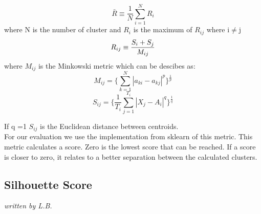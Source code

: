 \begin{equation}
	\bar{R} \equiv \frac{1}{N} \sum_{i=1}^{N} R_i  
\end{equation}
where N is the number of cluster and $R_i$ is the maximum of $R_{ij}$ where i$\neq$j 
\begin{equation}
	R_{ij} \equiv \frac{S_i+ S_j}{M_{ij}} \\
\end{equation}
where $M_{ij}$ is the Minkowski metric which can be descibes as: 
\begin{equation}	
	M_{ij} = \{ \sum_{k=1}^{N} |a_{ki} - a_{kj}  |^p    \} ^{  \frac{1}{p}}    	
\end{equation}
\begin{equation}
	S_{ij} = \{\frac{1}{T_i} \sum_{j=1}^{T_i} |X_{j} - A_{i}  |^q    \}^\frac{1}{q} 
\end{equation}
	
If q =1 	$S_{ij}$ is the Euclidean distance between centroids.  \\
  
For our evaluation we use the implementation from sklearn of this metric. This metric calculates a score. Zero is the lowest score that can be reached. If a score is closer to zero, it relates to a better separation between the calculated clusters. 

\subsection{Silhouette Score}
\label{Silhouette Score}
\textit{written by L.B.}\\

